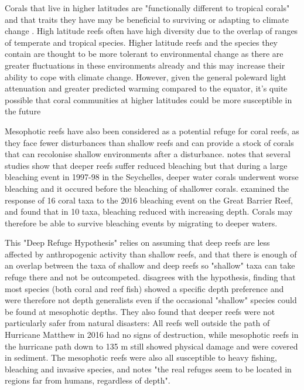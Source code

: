 \documentclass[11pt,a4paper]{article}
\begin{document}
Corals that live in higher latitudes are "functionally different to tropical corals" and that traits they have may be beneficial to surviving or adapting to climate change \citep{Camp2018}.
 High latitude reefs often have high diversity due to the overlap of ranges of temperate and tropical species. %
Higher latitude reefs and the species they contain are thought to be more tolerant to environmental change as there are greater fluctuations in these environments already%
 and this may increase their ability to cope with climate change. However, given the general poleward light attenuation and greater predicted warming compared to the equator, it's quite possible that coral communities at higher latitudes could be more susceptible in the future %

Mesophotic reefs have also been considered as a potential refuge for coral reefs, as they face fewer disturbances than shallow reefs and can provide a stock of corals that can recolonise shallow environments after a disturbance.
 \cite{Camp2018} notes that several studies show that deeper reefs suffer reduced bleaching %
but that during a large bleaching event in 1997-98 in the Seychelles, deeper water corals underwent worse bleaching and it occured before the bleaching of shallower corals.
 \cite{Baird2018} examined the response of 16 coral taxa to the 2016 bleaching event on the Great Barrier Reef, and found that in 10 taxa, bleaching reduced with increasing depth.
 Corals may therefore be able to survive bleaching events by migrating to deeper waters. 

This "Deep Refuge Hypothesis" relies on assuming that deep reefs are less affected by anthropogenic activity than shallow reefs, and that there is enough of an overlap between the taxa of shallow and deep reefs so "shallow" taxa can take refuge there and not be outcompeted.
 \cite{Rocha2018} disagrees with the hypothesis, finding that most species (both coral and reef fish) showed a specific depth preference and were therefore not depth generalists even if the occasional "shallow" species could be found at mesophotic depths.
 They also found that deeper reefs were not particularly safer from natural disasters: All reefs well outside the path of Hurricane Matthew in 2016 had no signs of destruction, while mesophotic reefs in the hurricane path down to 135 m still showed physical damage and were covered in sediment.
 The mesophotic reefs were also all susceptible to heavy fishing, bleaching and invasive species, and \cite{Rocha2018} notes "the real refuges seem to be located in regions far from humans, regardless of depth".
\end{document}
